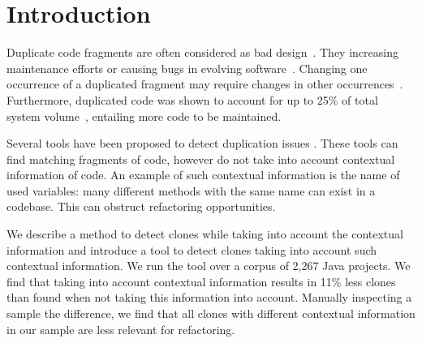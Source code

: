 \documentclass[conference]{IEEEtran}
\begin{document}
\section{Introduction}
Duplicate code fragments are often considered as bad design~\cite{fowler2018refactoring}. They increasing maintenance efforts or causing bugs in evolving software~\cite{heitlager2007practical}. Changing one occurrence of a duplicated fragment may require changes in other occurrences~\cite{ostberg2014automatically}. Furthermore, duplicated code was shown to account for up to 25\% of total system volume~\cite{bruntink2005use}, entailing more code to be maintained.

Several tools have been proposed to detect duplication issues \cite{roy2009comparison, svajlenko2014evaluating, sheneamer2016survey}. These tools can find matching fragments of code, however do not take into account contextual information of code. An example of such contextual information is the name of used variables: many different methods with the same name can exist in a codebase. This can obstruct refactoring opportunities.

We describe a method to detect clones while taking into account the contextual information and introduce a tool to detect clones taking into account such contextual information. We run the tool over a corpus of 2,267 Java projects. We find that taking into account contextual information results in 11\% less clones than found when not taking this information into account. Manually inspecting a sample the difference, we find that all clones with different contextual information in our sample are less relevant for refactoring.
\end{document}
